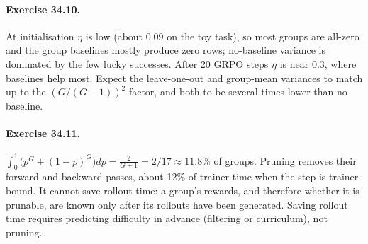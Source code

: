 \paragraph{Exercise 34.10.} At initialisation $\eta$ is low (about 0.09 on the toy task), so most
groups are all-zero and the group baselines mostly produce zero rows; no-baseline variance is
dominated by the few lucky successes. After 20 GRPO steps $\eta$ is near 0.3, where baselines help most.
Expect the leave-one-out and group-mean variances to match up to the $(G/(G-1))^2$ factor, and both
to be several times lower than no baseline.

\paragraph{Exercise 34.11.} $\int_0^1\big(p^G+(1-p)^G\big)dp=\frac{2}{G+1}=2/17\approx11.8\%$ of
groups. Pruning removes their forward and backward passes, about 12\% of trainer time when the
step is trainer-bound. It cannot save rollout time: a group's rewards, and therefore whether it is
prunable, are known only after its rollouts have been generated. Saving rollout time requires
predicting difficulty in advance (filtering or curriculum), not pruning.

